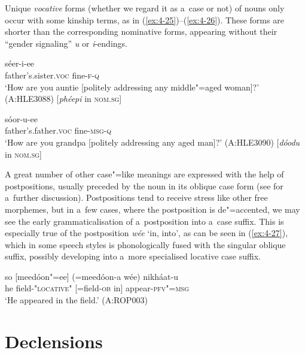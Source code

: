 Unique \textit{vocative} forms (whether we regard it as a~case or not) of nouns only occur with some kinship terms, as in (\ref{ex:4-25})--(\ref{ex:4-26}). These forms are shorter than the corresponding nominative forms, appearing without their ``gender signaling'' \textit{u} or \textit{i}-endings.


\begin{exe}
\ex
\label{ex:4-25}
\gll [phéep] séer-i-ee \\
	father's.sister.\textsc{voc} fine-\textsc{f-q} \\
\glt `How are you auntie [politely addressing any middle"=aged woman]?' (A:HLE3088) [\textit{phéepi} in \textsc{nom.sg}]
\end{exe}

\begin{exe}
\ex
\label{ex:4-26}
 \gll [dóod] sóor-u-ee \\
	father's.father.\textsc{voc} fine-\textsc{msg-q} \\
\glt `How are you grandpa [politely addressing any aged man]?' (A:HLE3090) [\textit{dóodu} in \textsc{nom.sg}]
\end{exe}

A great number of other case"=like meanings are expressed with the help of postpositions, usually
preceded by the noun in its oblique case form (see  for a~further discussion). Postpositions
tend to receive stress like other free morphemes, but in a~few cases, where the postposition is
de"=accented, we may see the early grammaticalisation of a~postposition into a~case suffix. This is
especially true of the postposition \textit{wée} `in, into', as can be seen in (\ref{ex:4-27}),
which in some speech styles is phonologically fused with the singular oblique suffix, possibly
developing into a~more specialised locative case suffix.

\begin{exe}
\ex
\label{ex:4-27}
 \gll so [meedóon"=ee] (=meedóon-a wée) nikháat-u \\
	he field\textsc{-"locative"} [=field-\textsc{ob} in] appear-\textsc{pfv"=msg} \\
\glt `He appeared in the field.' (A:ROP003)
\end{exe}

\section{Declensions}
\label{sec:4-6}

